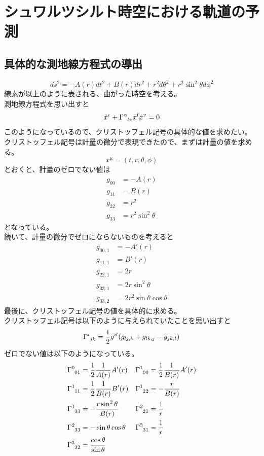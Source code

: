 \documentclass[dvipdfmx]{report} %
\begin{document}
\section{
	シュワルツシルト時空における軌道の予測
}
\subsection{
	具体的な測地線方程式の導出
}

\[
ds^2 = -A(r)dt^2 + B(r)dr^2 + r^2d \theta^2 + r^2 \sin^2 \theta d\phi^2
\]
線素が以上のように表される、曲がった時空を考える。\\
測地線方程式を思い出すと
\[
\ddot{x}^{\epsilon} + \tensor{\Gamma}{^{\alpha}_{l \upsilon}} \dot{x}^l \dot{x}^{\upsilon} = 0
\]
このようになっているので、クリストッフェル記号の具体的な値を求めたい。\\
クリストッフェル記号は計量の微分で表現できたので、まずは計量の値を求める。\\
\[
x^{\mu} = ( t, r, \theta, \phi )
\]
とおくと、計量のゼロでない値は
\begin{equation*}
\begin{split}
g_{00} &= -A(r)\\
g_{11} &= B(r)\\
g_{22} &= r^2\\
g_{33} &= r^2 \sin^2 \theta
\end{split}
\end{equation*}
となっている。\\
続いて、計量の微分でゼロにならないものを考えると
\begin{equation*}
\begin{split}
g_{00,1} &= -A'(r)\\
g_{11,1} &= B'(r)\\
g_{22,1} &= 2r\\
g_{33,1} &= 2r \sin^2 \theta\\
g_{33,2} &= 2 r^2 \sin \theta \cos \theta
\end{split}
\end{equation*}
最後に、クリストッフェル記号の値を具体的に求める。\\
クリストッフェル記号は以下のように与えられていたことを思い出すと
\[
\tensor{\Gamma}{^i_{jk}} = \frac{1}{2} g^{il} (g_{lj,k} + g_{lk,j} - g_{jk,l})
\]
ゼロでない値は以下のようになっている。
\begin{align*}
\tensor{\Gamma}{^0_{01}} &= \frac{1}{2} \frac{1}{A(r)} A'(r) &
\tensor{\Gamma}{^1_{00}} &= \frac{1}{2} \frac{1}{B(r)} A'(r)\\
\tensor{\Gamma}{^1_{11}} &= \frac{1}{2} \frac{1}{B(r)} B'(r) &
\tensor{\Gamma}{^1_{22}} &= - \frac{r}{B(r)}\\
\tensor{\Gamma}{^1_{33}} &= - \frac{r \sin^2 \theta}{B(r)} &
\tensor{\Gamma}{^2_{21}} &= \frac{1}{r}\\
\tensor{\Gamma}{^2_{33}} &= - \sin \theta \cos \theta &
\tensor{\Gamma}{^3_{31}} &= \frac{1}{r}\\
\tensor{\Gamma}{^3_{32}} &= \frac{ \cos \theta }{ \sin \theta }
\end{align*}
\end{document}
